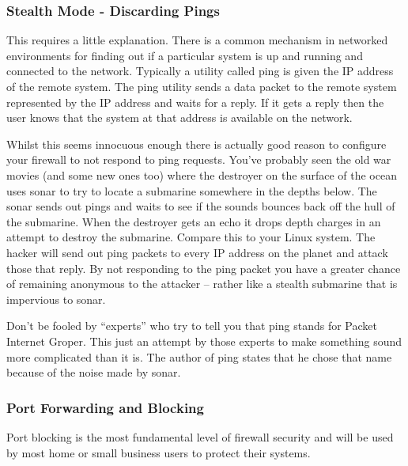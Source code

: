 \subsubsection{Stealth Mode - Discarding Pings}
\label{sssec:stealth_mode_discarding_pings}

This requires a little explanation. There is a common mechanism in networked
environments for finding out if a particular system is up and running and
connected to the network. Typically a utility called ping is given the IP
address of the remote system. The ping utility sends a data packet to the remote
system represented by the IP address and waits for a reply. If it gets a reply
then the user knows that the system at that address is available on the network.



Whilst this seems innocuous enough there is actually good reason to configure
your firewall to not respond to ping requests. You’ve probably seen the old war
movies (and some new ones too) where the destroyer on the surface of the ocean
uses sonar to try to locate a submarine somewhere in the depths below. The sonar
sends out pings and waits to see if the sounds bounces back off the hull of the
submarine. When the destroyer gets an echo it drops depth charges in an attempt
to destroy the submarine. Compare this to your Linux system. The hacker will
send out ping packets to every IP address on the planet and attack those that
reply. By not responding to the ping packet you have a greater chance of
remaining anonymous to the attacker – rather like a stealth submarine that is
impervious to sonar. 



Don’t be fooled by “experts” who try to tell you that ping stands for Packet
Internet Groper. This just an attempt by those experts to make something sound
more complicated than it is. The author of ping states that he chose that name
because of the noise made by sonar.



\subsubsectionend

\subsubsection{Port Forwarding and Blocking}
\label{sssec:port_forwarding_and_blocking}

Port blocking is the most fundamental level of firewall security and will be
used by most home or small business users to protect their systems. 



